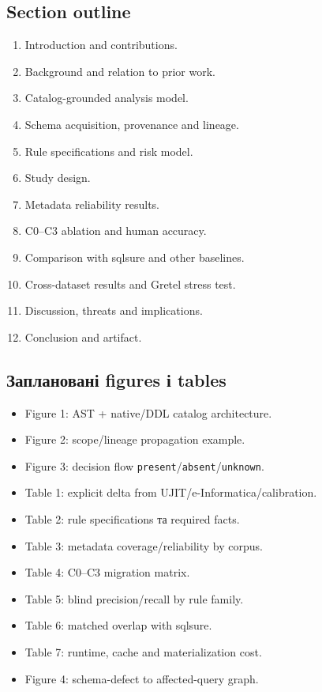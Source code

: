 \documentclass[11pt,a4paper]{article}
\newcommand{\unknown}{\texttt{unknown}}
\newcommand{\presentstate}{\texttt{present}}
\newcommand{\absentstate}{\texttt{absent}}
\begin{document}
\subsection{Section outline}

\begin{enumerate}
\item Introduction and contributions.
\item Background and relation to prior work.
\item Catalog-grounded analysis model.
\item Schema acquisition, provenance and lineage.
\item Rule specifications and risk model.
\item Study design.
\item Metadata reliability results.
\item C0--C3 ablation and human accuracy.
\item Comparison with sqlsure and other baselines.
\item Cross-dataset results and Gretel stress test.
\item Discussion, threats and implications.
\item Conclusion and artifact.
\end{enumerate}

\subsection{Заплановані figures і tables}

\begin{itemize}
\item Figure 1: AST + native/DDL catalog architecture.
\item Figure 2: scope/lineage propagation example.
\item Figure 3: decision flow \presentstate/\absentstate/\unknown.
\item Table 1: explicit delta from UJIT/e-Informatica/calibration.
\item Table 2: rule specifications та required facts.
\item Table 3: metadata coverage/reliability by corpus.
\item Table 4: C0--C3 migration matrix.
\item Table 5: blind precision/recall by rule family.
\item Table 6: matched overlap with sqlsure.
\item Table 7: runtime, cache and materialization cost.
\item Figure 4: schema-defect to affected-query graph.
\end{itemize}
\end{document}
